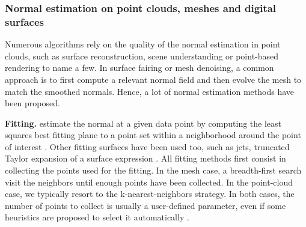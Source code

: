 


\subsubsection{Normal estimation on point clouds, meshes and digital surfaces}
\label{sec:estim:all}

Numerous algorithms rely on the quality of the normal estimation in point clouds, such as
surface reconstruction, scene understanding or point-based rendering to name a few.
In surface fairing or mesh denoising, a common approach is to first compute a relevant
normal field and then evolve the mesh to match the smoothed normals.
Hence, a lot of normal estimation methods have been proposed. 

\noindent\textbf{Fitting.}
\citeauthor*{Hoppe1992} estimate the normal at a given data point by computing
the least squares best fitting plane to a point set within a neighborhood
around the point of interest \cite{Hoppe1992}.
Other fitting surfaces have been used too, such as jets, \ie truncated Taylor expansion
of a surface expression \cite{Cazals2005,Cazals2008}. 
All fitting methods first consist in collecting the points used for the fitting.
In the mesh case, a breadth-first search visit the neighbors until enough points
have been collected. In the point-cloud case, we typically resort to the k-nearest-neighbors
strategy. In both cases, the number of points to collect is usually a user-defined parameter,
even if some heuristics are proposed to select it automatically \cite{Hoppe1992,Cazals2005}.  


